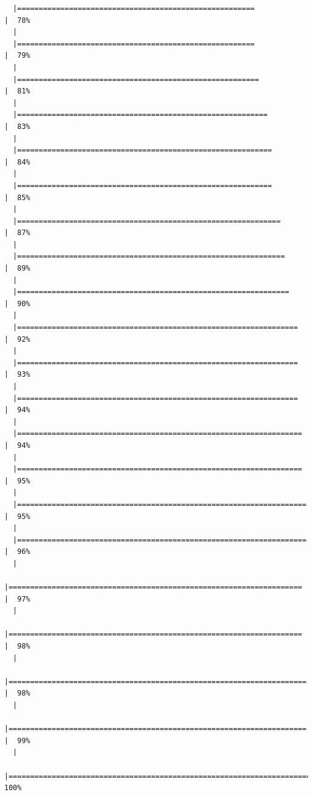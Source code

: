 \documentclass[
  letterpaper,
  DIV=11,
  numbers=noendperiod]{scrreprt}
\begin{document}
\begin{verbatim}
  |=======================================================               |  78%
  |                                                                            
  |=======================================================               |  79%
  |                                                                            
  |========================================================              |  81%
  |                                                                            
  |==========================================================            |  83%
  |                                                                            
  |===========================================================           |  84%
  |                                                                            
  |===========================================================           |  85%
  |                                                                            
  |=============================================================         |  87%
  |                                                                            
  |==============================================================        |  89%
  |                                                                            
  |===============================================================       |  90%
  |                                                                            
  |=================================================================     |  92%
  |                                                                            
  |=================================================================     |  93%
  |                                                                            
  |=================================================================     |  94%
  |                                                                            
  |==================================================================    |  94%
  |                                                                            
  |==================================================================    |  95%
  |                                                                            
  |===================================================================   |  95%
  |                                                                            
  |===================================================================   |  96%
  |                                                                            
  |====================================================================  |  97%
  |                                                                            
  |====================================================================  |  98%
  |                                                                            
  |===================================================================== |  98%
  |                                                                            
  |===================================================================== |  99%
  |                                                                            
  |======================================================================| 100%
\end{verbatim}
\end{document}
